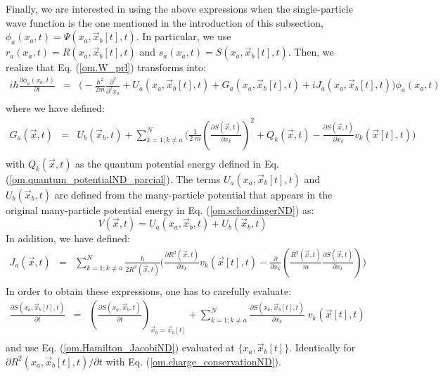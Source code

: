 \documentclass[nofootinbib, secnumarabic, amsmath, nobibnotes,10pt,aps,pra]{revtex4-1}
\newcommand{\eref}[1]{Eq. (\ref{#1})}
\begin{document}
Finally, we are interested in using the above expressions when the single-particle wave function is the one mentioned in the introduction of this subsection, $\phi_a(x_a,t) = \Psi(x_a,\vec x_b[t],t)$. In particular, we use $r_a(x_a,t) = R(x_{a},\vec x_{b}[t],t)$ and $s_a(x_a,t) = S(x_{a},\vec x_{b}[t],t)$. Then, we realize that \eref{om.W_prl} transforms into:
\begin{eqnarray}
\label{om.pseudoscho_prl}
i\hbar\frac{\partial \phi_{a}(x_{a},t)}{\partial t} &=& \bigg( -\frac
{\hbar^2} {2m}\frac {\partial^2}{\partial^2 {x_a}} + U_{a}(x_{a},\vec
x_{b}[t],t)+ G_{a}(x_{a},\vec x_{b}[t],t) + i J_{a}(x_{a},\vec x_{b}[t],t) \bigg) \phi_{a}(x_{a},t)\nonumber\\
\end{eqnarray}
where we have defined:
\begin{eqnarray}
\label{om.G_prl}
G_{a}(\vec x,t) &=& U_b(\vec x_{b},t) + \sum_{k = 1;k\neq a}^{N} \Bigg( \frac {1} {2 \; m} \left (\frac {\partial S(\vec x,t)} {\partial x_k} \right)^2+ Q_k(\vec x,t) - \frac {\partial S(\vec x,t)} {\partial x_k} v_k(\vec x[t],t) \Bigg)\nonumber\\
\end{eqnarray}
with $Q_k(\vec x,t)$ as the quantum potential energy defined in \eref{om.quantum_potentialND_parcial}. The terms \textit{$U_{a}(x_{a},\vec x_{b}[t],t)$} and \textit{$U_b(\vec x_{b},t)$} are defined from the many-particle potential that appears in the original many-particle potential energy in \eref{om.schordingerND} as:
\begin{equation}
\label{om.U_prl}
V(\vec x,t) = U_{a}(x_{a},\vec x_{b},t) + U_b(\vec x_{b},t)
\end{equation}
In addition, we have defined:
\begin{eqnarray}
\label{om.J_prl}
J_{a}(\vec x,t) &=& \sum_{k = 1;k\neq a}^{N} \frac {\hbar} {2R^2(\vec
x,t)} \Bigg( \frac {\partial R^2(\vec x,t)} {\partial x_k} v_k(\vec
x[t],t) - \frac {\partial} {\partial x_k} \left( \frac {R^2(\vec x,t)} {m} \frac {\partial S(\vec x,t)} {\partial x_k} \right) \Bigg)\nonumber\\
\end{eqnarray}
In order to obtain these expressions, one has to carefully evaluate:
\begin{eqnarray}
\label{om.prlpas}
\frac {\partial S(x_a,\vec x_b[t],t)} {\partial t} &=& \left( \frac
{\partial S(x_a,\vec x_b,t)} {\partial t}\right)_{\vec x_b = \vec
x_b[t]}+ \sum_{k = 1; k \neq a}^{N}\frac {\partial S(x_a,\vec x_b[t],t)}{\partial x_k} \; v_k(\vec x[t],t)\nonumber\\
\end{eqnarray}
and use \eref{om.Hamilton_JacobiND} evaluated at $\{x_a,\vec x_b[t]\}$. Identically for  $\partial R^2(x_a,\vec x_b[t],t)/\partial t$ with \eref{om.charge_conservationND}.
\end{document}
